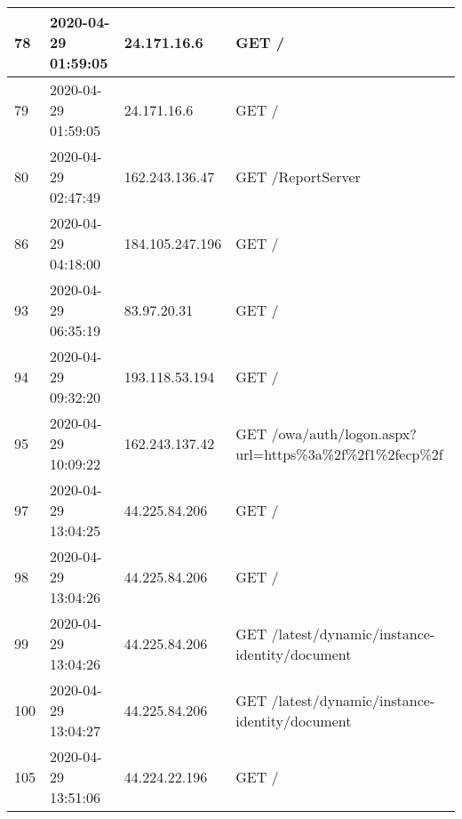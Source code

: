 \documentclass[12pt]{article}
\begin{document}
\begin{longtable}{|l|l|l|l|}
78  & 2020-04-29 01:59:05 & 24.171.16.6     & GET /                                                                                                                               \\ \hline
79  & 2020-04-29 01:59:05 & 24.171.16.6     & GET /                                                                                                                               \\ \hline
80  & 2020-04-29 02:47:49 & 162.243.136.47  & GET /ReportServer                                                                                                                   \\ \hline
86  & 2020-04-29 04:18:00 & 184.105.247.196 & GET /                                                                                                                               \\ \hline
93  & 2020-04-29 06:35:19 & 83.97.20.31     & GET /                                                                                                                               \\ \hline
94  & 2020-04-29 09:32:20 & 193.118.53.194  & GET /                                                                                                                               \\ \hline
95  & 2020-04-29 10:09:22 & 162.243.137.42  & GET /owa/auth/logon.aspx?url=https\%3a\%2f\%2f1\%2fecp\%2f                                                                          \\ \hline
97  & 2020-04-29 13:04:25 & 44.225.84.206   & GET /                                                                                                                               \\ \hline
98  & 2020-04-29 13:04:26 & 44.225.84.206   & GET /                                                                                                                               \\ \hline
99  & 2020-04-29 13:04:26 & 44.225.84.206   & GET /latest/dynamic/instance-identity/document                                                                                      \\ \hline
100 & 2020-04-29 13:04:27 & 44.225.84.206   & GET /latest/dynamic/instance-identity/document                                                                                      \\ \hline
105 & 2020-04-29 13:51:06 & 44.224.22.196   & GET /                                                                                                                               \\ \hline

\end{longtable}
\end{document}
